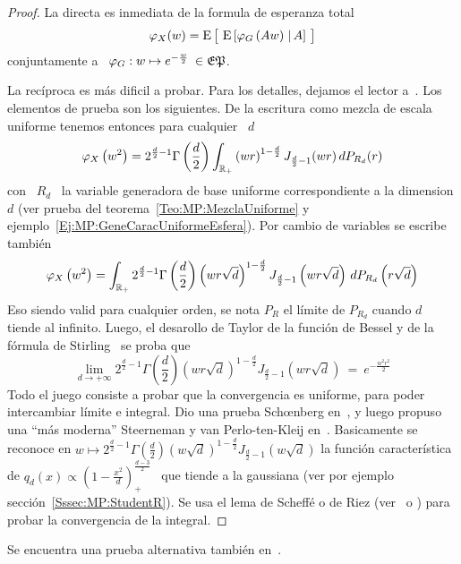 \begin{proof}
  La directa es inmediata de la formula de esperanza total
  \[
  \varphi_X(w)  =  \operatorname{E}\big[ \,  \operatorname{E}\left[  \varphi_G\left( A w \right)  \left.  \right|
      A\right] \, \big]
  \]
  conjuntamente a \ $\varphi_G: w \mapsto e^{-\frac{w}{2}} \: \in \mathfrak{EP}$.

  La rec\'iproca es  m\'as dificil a probar. Para los  detalles, dejamos el lector
  a~\cite{Sch38}. Los  elementos de prueba  son los siguientes. De  la escritura
  como mezcla de escala uniforme tenemos entonces para cualquier \ $d$
  \[
  \varphi_X\left(  w^2  \right)   =  2^{\frac{d}{2}-1}  \Gamma\left(  \frac{d}{2}
  \right) \int_{\mathbb{R}_+} \left(  w r \right)^{1-\frac{d}{2}} J_{\frac{d}{2}-1}(w
  r) \, dP_{R_d}(r)
  \]
  con \  $R_d$ \ la  variable generadora de  base uniforme correspondiente  a la
  dimension   $d$   (ver   prueba  del   teorema~\ref{Teo:MP:MezclaUniforme}   y
  ejemplo~\ref{Ej:MP:GeneCaracUniformeEsfera}).  Por   cambio  de  variables  se
  escribe tambi\'en
  \[
  \varphi_X\left(  w^2 \right)  = \int_{\mathbb{R}_+}  2^{\frac{d}{2}-1} \Gamma\left(
    \frac{d}{2}   \right)   \left(    w   r   \sqrt{d}   \right)^{1-\frac{d}{2}}
  J_{\frac{d}{2}-1}\left(  w r  \sqrt{d}  \right) \,  dP_{R_d}\left( r  \sqrt{d}
  \right)
  \]
  Eso siendo  valid para cualquier orden,  se nota $P_R$ el  l\'imite de $P_{R_d}$
  cuando $d$ tiende al infinito.  Luego,  el desarollo de Taylor de la funci\'on
  de Bessel  y de  la f\'ormula de  Stirling~\cite[Ec.~8.402~y~8.327]{GraRyz} se
  proba que
  \[
  \lim_{d \to +\infty} 2^{\frac{d}{2}-1} \Gamma\left( \frac{d}{2} \right) \left(
    w  r \sqrt{d} \right)^{1-\frac{d}{2}}  J_{\frac{d}{2}-1}\left( w  r \sqrt{d}
  \right) \: = \: e^{-\frac{w^2 r^2}{2}}
  \]
  Todo el  juego consiste a probar  que la convergencia es  uniforme, para poder
  intercambiar   l\'imite   e    integral.    Dio   una   prueba   Sch{\oe}nberg
  en~\cite{Sch38},  y  luego propuso  una  ``m\'as  moderna''  Steerneman y  van
  Perlo-ten-Kleij  en~\cite{SteVan05}.  Basicamente  se reconoce  en  $w \mapsto
  2^{\frac{d}{2}-1}   \Gamma\left(  \frac{d}{2}   \right)   \left(  w   \sqrt{d}
  \right)^{1-\frac{d}{2}}   J_{\frac{d}{2}-1}\left(  w   \sqrt{d}   \right)$  la
  funci\'on  caracter\'istica  de  $q_d(x)  \propto  \left(  1  -  \frac{x^2}{d}
  \right)_+^{\frac{d-3}{2}}$  \  que tiende  a  la  gaussiana  (ver por  ejemplo
  secci\'on~\ref{Sssec:MP:StudentR}).   Se usa el  lema de  Scheff\'e o  de Riez
  (ver~\cite{Rie28,  Sch47, Nov72,  Kus10} o  \cite{AthLah06,  Bog07:v1, Bil12})
  para probar la convergencia de la integral.
\end{proof}
%
\noindent Se encuentra una prueba alternativa tambi\'en en~\cite{FanKot90, Kin72}.

